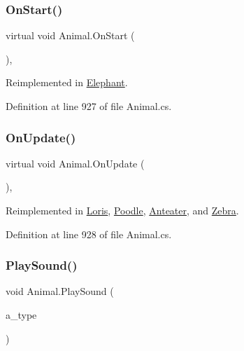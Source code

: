 \mbox{\label{class_animal_a5e8ba3858f4d2c35c4a8d42fdbcc66b5}} 
\subsubsection{\texorpdfstring{On\+Start()}{OnStart()}}
{\footnotesize\ttfamily virtual void Animal.\+On\+Start (\begin{DoxyParamCaption}{ }\end{DoxyParamCaption})\hspace{0.3cm}{\ttfamily [protected]}, {\ttfamily [virtual]}}



Reimplemented in \mbox{\hyperlink{class_elephant_a4e12b9f8aa13e0ecb5b40c1d68f966aa}{Elephant}}.



Definition at line 927 of file Animal.\+cs.

\mbox{\label{class_animal_a0b0cf85dbc03ad6ed1878e90c2ac84b1}} 
\subsubsection{\texorpdfstring{On\+Update()}{OnUpdate()}}
{\footnotesize\ttfamily virtual void Animal.\+On\+Update (\begin{DoxyParamCaption}{ }\end{DoxyParamCaption})\hspace{0.3cm}{\ttfamily [protected]}, {\ttfamily [virtual]}}



Reimplemented in \mbox{\hyperlink{class_loris_a398638e87e93178426ab5a0486a564f7}{Loris}}, \mbox{\hyperlink{class_poodle_a48df28b8984d812658dae3516e9e421a}{Poodle}}, \mbox{\hyperlink{class_anteater_a51eaca4815562f28e36517999ed5b77f}{Anteater}}, and \mbox{\hyperlink{class_zebra_af47a27c78f160200774e3b6e740e52be}{Zebra}}.



Definition at line 928 of file Animal.\+cs.

\mbox{\label{class_animal_ab884d829130a352bb85070f3dc0fb888}} 
\subsubsection{\texorpdfstring{Play\+Sound()}{PlaySound()}}
{\footnotesize\ttfamily void Animal.\+Play\+Sound (\begin{DoxyParamCaption}\item[{\mbox{\hyperlink{class_animal_aa498775210af23df33eb0095e81ecbf7}{S\+O\+U\+N\+D\+\_\+\+E\+V\+E\+NT}}}]{a\+\_\+type }\end{DoxyParamCaption})}



